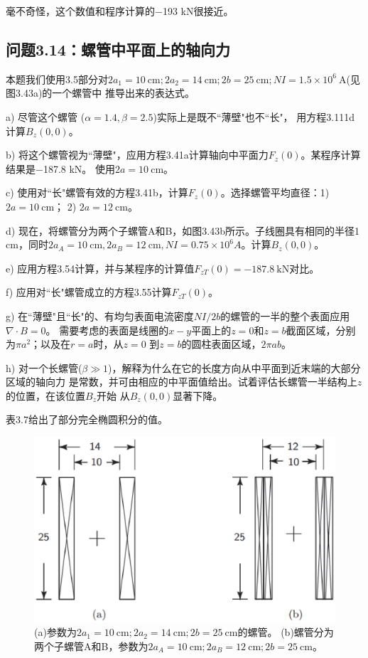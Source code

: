 毫不奇怪，这个数值和程序计算的−193 kN很接近。



\subsection{问题3.14：螺管中平面上的轴向力}
本题我们使用3.5部分对$2a_1 = 10\ \mathrm{cm}; 2a_2 = 14\ \mathrm{cm}; 2b = 25\ \mathrm{cm}; NI = 1.5×10^6\ \mathrm{A}$(见图3.43a)的一个螺管中
推导出来的表达式。

a) 尽管这个螺管 ($\alpha = 1.4,\beta = 2.5$)实际上是既不``薄壁"也不``长"，
用方程3.111d计算$B_z(0, 0)$。

b) 将这个螺管视为``薄壁"，应用方程3.41a计算轴向中平面力$F_z(0)$。某程序计算结果是−187.8 kN。
使用$2a=10\ \mathrm{cm}$。

c) 使用对``长"螺管有效的方程3.41b，计算$F_z(0)$。选择螺管平均直径：1) $2a =10\ \mathrm{cm}$； 2) $2a=12\ \mathrm{cm}$。

d) 现在，将螺管分为两个子螺管A和B，如图3.43b所示。子线圈具有相同的半径1 cm，同时$2a_A=10\ \mathrm{cm}, 2a_B=12\ \mathrm{cm},
NI =0.75\times10^6 A$。计算$B_z(0, 0)$。

e) 应用方程3.54计算，并与某程序的计算值$F_{zT}(0)=−187.8\ \mathrm{kN}$对比。

f) 应用对``长"螺管成立的方程3.55计算$F_{zT}(0)$。

g) 在``薄壁"且``长"的、有均匀表面电流密度$NI/2b$的螺管的一半的整个表面应用$\nabla\cdot B=0$。
需要考虑的表面是线圈的$x-y$平面上的$z=0$和$z=b$截面区域，分别为$\pi a^2$；以及在$r=a$时，从$z=0$
到$z=b$的圆柱表面区域，$2\pi ab$。

h) 对一个长螺管($\beta\gg 1$)，解释为什么在它的长度方向从中平面到近末端的大部分区域的轴向力
是常数，并可由相应的中平面值给出。试着评估长螺管一半结构上$z$的位置，在该位置$B_z$开始
从$B_z(0,0)$显著下降。

表3.7给出了部分完全椭圆积分的值。
\begin{figure}[htbp]
	\centering
	\includegraphics[scale=0.6]{chpt3/figs/fig3.43.eps}
	\caption{(a)参数为$2a_1=10\ \mathrm{cm}; 2a_2=14\ \mathrm{cm}; 2b=25\ \mathrm{cm}$的螺管。
		(b)螺管分为两个子螺管A和B，参数为$2a_A=10\ \mathrm{cm}; 2a_B=12\ \mathrm{cm}; 2b=25\ \mathrm{cm}$。}
\end{figure}


